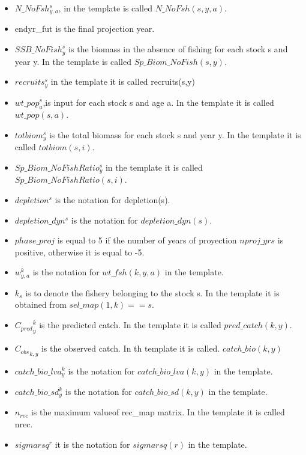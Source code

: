 \documentclass{article}
\begin{document}
\begin{itemize}
    
    \item $N\_NoFsh^s_{y,a}$, 
 in the template is called  $N\_NoFsh(s,y,a)$.
    \item endyr\_fut is the final projection year.
    \item $SSB\_NoFish^s_y$ is the biomass in the absence of fishing 
 for each stock s and year y. In the template is called $Sp\_Biom\_NoFish(s,y)$.
    
    \item $recruits^s_y$ in the template it is called recruits(s,y)
    \item $wt\_pop^s_a$,is input for each stock s and age a. In the template it is called  $wt\_pop(s,a)$.
    \item $totbiom^s_y$ is the total biomass for each stock s and year y. In the template it is called $totbiom(s,i)$.
    \item $Sp\_Biom\_NoFishRatio^s_y$ in the template it is called $Sp\_Biom\_NoFishRatio(s,i)$.
    \item $depletion^s$ is the notation for depletion(s).
    \item $depletion\_dyn^s$ is the notation for $depletion\_dyn(s) $.
    \item $phase\_proj$ is equal to 5 if the number of years of proyection $nproj\_yrs$ is positive, otherwise it is equal to -5.
    \item $w_{y,a}^{k}$ is the notation for $wt\_fsh(k,y,a)$ in the template.
    \item $k_s$  is to denote the fishery belonging to the stock s. In the template it is obtained from $sel\_map(1,k) == s$.
    
    \item ${C_{pred}}^{k}_y$ is the predicted catch. In the template it is called $pred\_catch(k,y)$.
    \item ${C_{obs}}_{k,y}$ is the observed catch. In th template it is called. $catch\_bio(k,y)$ 
    \item $catch\_bio\_lva^k_y$ is the notation for  $catch\_bio\_lva(k,y)$ in the template.
    \item $catch\_bio\_sd^k_y$ is the notation for $catch\_bio\_sd(k,y)$ in the template.
    \item $n_{rec}$ is the maximum valueof rec\_map matrix. In the template it is called nrec.
    \item $sigmarsq^r$ it is the notation for 
 $sigmarsq(r)$ in the template.
    

\end{itemize}
\end{document}

